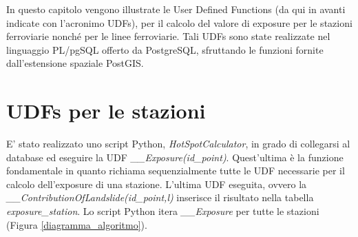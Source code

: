 In questo capitolo vengono illustrate le User Defined Functions (da qui in avanti indicate con l’acronimo UDFs), per il calcolo del valore di exposure per le stazioni ferroviarie nonché per le linee ferroviarie. Tali UDFs sono state realizzate nel linguaggio PL/pgSQL offerto da PostgreSQL, sfruttando le funzioni fornite dall’estensione spaziale PostGIS.

\section{UDFs per le stazioni}
E' stato realizzato uno script Python, \textit{HotSpotCalculator}, in grado di collegarsi al database ed eseguire la UDF  \textit{\_\_Exposure(id\_point)}. Quest'ultima è la funzione fondamentale in quanto richiama sequenzialmente tutte le UDF necessarie per il calcolo dell'exposure di una stazione. L'ultima UDF eseguita, ovvero la \textit{\_\_ContributionOfLandslide(id\_point,l)} inserisce il risultato nella tabella \textit{exposure\_station}.
Lo script Python itera \textit{\_\_Exposure} per tutte le stazioni (Figura \ref{diagramma_algoritmo}).  

